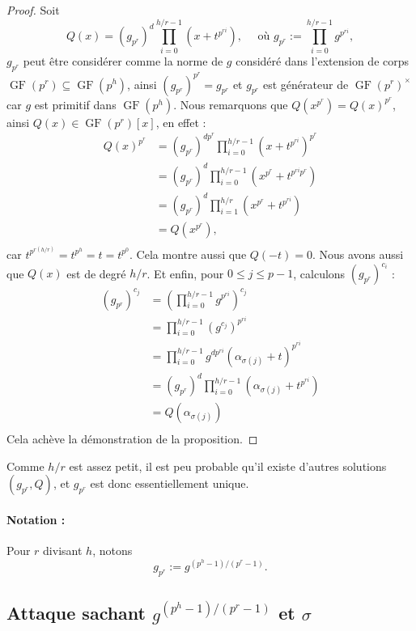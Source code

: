 \documentclass[a4paper, titlepage]{article}
\theoremstyle{definition}
\theoremstyle{remark}
\def\gf{\operatorname{GF}}
\begin{document}
\begin{proof}
Soit 
$$Q(x) = (g_{p^r})^d \prod_{i=0}^{h/r-1} \left(x+t^{p^{ri}}\right),
\quad \text{ où } g_{p^r} := \prod_{i=0}^{h/r-1} g^{p^{ri}},$$
$g_{p^r}$ peut être considérer comme la norme de $g$ considéré dans l'extension de corps $\gf(p^r) \subseteq \gf(p^h)$, ainsi $(g_{p^r})^{p^r} = g_{p^r}$ et $g_{p^r}$ est générateur de $\gf(p^r)^\times$ car $g$ est primitif dans $\gf(p^h)$. Nous remarquons que $Q\left(x^{p^r}\right) = Q(x)^{p^r}$, ainsi $Q(x) \in \gf(p^r)[x]$, en effet :
\begin{align*}
Q\left(x\right)^{p^r} &= (g_{p^r})^{dp^r} \prod_{i=0}^{h/r-1} \left(x+t^{p^{ri}}\right)^{p^r} \\
&= (g_{p^r})^{d} \prod_{i=0}^{h/r-1} \left(x^{p^r} + t^{p^{ri}p^r}\right) \\
&= (g_{p^r})^{d} \prod_{i=1}^{h/r} \left(x^{p^r} + t^{p^{ri}}\right) \\
&= Q\left(x^{p^r}\right), \\
\end{align*}
car $t^{p^{r(h/r)}} = t^{p^h} = t = t^{p^0}$. Cela montre aussi que $Q(-t) = 0$. Nous avons aussi que $Q(x)$ est de degré $h/r$. Et enfin, pour $0\leqslant j \leqslant p-1$, calculons $(g_{p^r})^{c_i}$ :
\begin{align*}
(g_{p^r})^{c_j} &= \left(\prod_{i=0}^{h/r-1} g^{p^{ri}}\right)^{c_j}\\
&= \prod_{i=0}^{h/r-1} \left(g^{c_j}\right)^{p^{ri}}\\
&= \prod_{i=0}^{h/r-1} g^{dp^{ri}}\left(\alpha_{\sigma(j)} + t\right)^{p^{ri}}\\
&= (g_{p^r})^d \prod_{i=0}^{h/r-1} \left(\alpha_{\sigma(j)} + t^{p^{ri}}\right)\\
&= Q\left(\alpha_{\sigma(j)}\right) \\
\end{align*}
Cela achève la démonstration de la proposition.
\end{proof}

Comme $h/r$ est assez petit, il est peu probable qu'il existe d'autres solutions $(g_{p^r}, Q)$, et $g_{p^r}$ est donc essentiellement unique.

\paragraph*{Notation :} Pour $r$ divisant $h$, notons $$g_{p^r} := g^{(p^h-1)/(p^r-1)}.$$

\subsection{Attaque sachant $g^{(p^h-1)/(p^r-1)}$ et $\sigma$}
\end{document}
